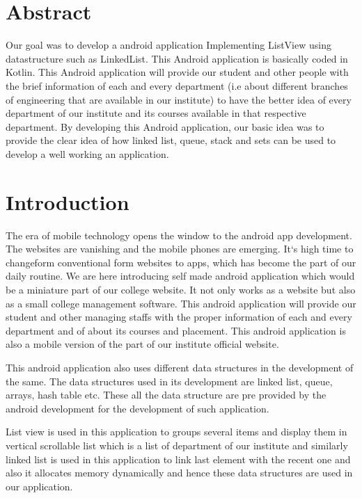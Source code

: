 \documentclass[11pt,a4paper]{report}
\begin{document}
\chapter{Abstract}		

Our goal was to develop a android application Implementing ListView using datastructure such as LinkedList. This Android application is basically coded in Kotlin. This Android application will provide our 
student and other people with the brief information of each and every department (i.e about different branches of engineering that are available in our institute) to have the better idea of every department of 
our institute and its courses available in that respective department. By developing this Android application, our basic idea was to provide the clear idea of how linked list, queue, stack and sets can be used 
to develop a well working an application.
\vspace{5pt} 


\tableofcontents

\chapter{Introduction}

The era of mobile technology opens the window to the android app development. The websites are vanishing and the mobile phones are emerging. It`s high time to changeform conventional form websites to apps, which 
has become the part of our daily routine. We are here introducing self made android application which would be a miniature part of our college website. It not only works as a website but also as a small college 
management software. This android application will provide our student and other managing staffs with the proper information of each and every department and of about its courses and placement. This android 
application is also a mobile version of the part of our institute official website.

This android application also uses different data structures in the development of the same. The data structures used in its development are linked list, queue, arrays, hash table etc. These all the data structure
 are pre provided by the android development for the development of such application.
 
 List view is used in this application to groups several items and display them in vertical scrollable list which is a list of department of our institute and similarly linked list is used in this application to 
 link last element with the recent one and also it allocates memory dynamically and hence these data structures are used in our application.
\end{document}
